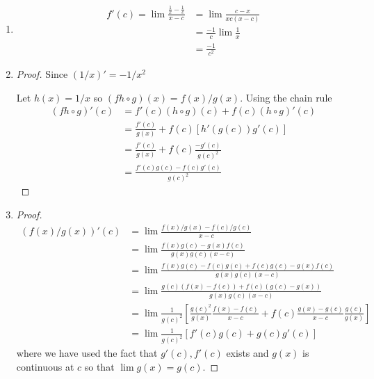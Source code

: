 \begin{enumerate}[label=(\alph*)]
    \item 
    \begin{align*}
        f'(c) = \lim \frac{\frac{1}{x}-\frac{1}{c}}{x-c} &= \lim \frac{c-x}{xc(x-c)} \\
        &= \frac{-1}{c} \lim \frac{1}{x} \\
        &= \frac{-1}{c^2}
    \end{align*}

    \item
    \begin{proof}
        Since $(1/x)'=-1/x^2$ 
        
        Let $h(x)=1/x$ so $(f h\circ g)(x)=f(x)/g(x)$.
        Using the chain rule
        \begin{align*}
            (f h\circ g)'(c) &= f'(c) (h\circ g)(c)  + f(c)(h\circ g)'(c)  \\ 
                             &= \frac{ f'(c)}{g(x)}  + f(c)[h'(g(c))g'(c)]  \\
                             &=  \frac{ f'(c)}{g(x)}  + f(c)\frac{-g'(c)}{g(c)^2}  \\
                             &=  \frac{f'(c)g(c) - f(c)g'(c)}{g(c)^2}
        \end{align*}
    \end{proof}

    \item
    \begin{proof}
        \begin{align*}
            (f(x)/g(x))'(c) &= \lim \frac{f(x)/g(x) - f(c)/g(c)}{x-c} \\
                        &= \lim \frac{f(x)g(c)-g(x)f(c)}{g(x)g(c)(x-c)} \\
                        &= \lim \frac{f(x)g(c)-f(c)g(c)+f(c)g(c)-g(x)f(c)}{g(x)g(c)(x-c)} \\
                        &= \lim \frac{g(c)(f(x)-f(c))+f(c)(g(c)-g(x))}{g(x)g(c)(x-c)} \\
                        &= \lim \frac{1}{g(c)^2}[\frac{g(c)^2}{g(x)}\frac{f(x)-f(c)}{x-c}+f(c)\frac{g(x)-g(c)}{x-c}\frac{g(c)}{g(x)}] \\
                        &= \lim \frac{1}{g(c)^2}[f'(c)g(c)+g(c)g'(c)]
        \end{align*}
        where we have used the fact that $g'(c), f'(c)$ exists and $g(x)$ is continuous at $c$
        so that $\lim g(x)=g(c)$.
    \end{proof}
\end{enumerate}

